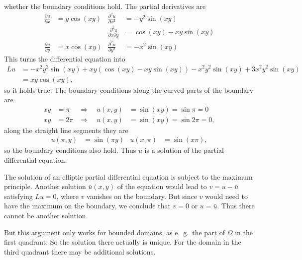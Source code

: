 \begin{loesung}
\begin{teilaufgaben}
whether the boundary conditions hold.
The partial derivatives are
\begin{align*}
\frac{\partial u}{\partial x}&=y\cos(xy)
&
\frac{\partial^2 u}{\partial x^2}&=-y^2\sin(xy)
\\
&&\frac{\partial^2 u}{\partial x\partial y}&=\cos(xy)-xy\sin(xy)
\\
\frac{\partial u}{\partial y}&=x\cos(xy)
&
\frac{\partial^2 u}{\partial y^2}&=-x^2\sin(xy)
\end{align*}
This turns the differential equation into
\begin{align*}
Lu&=-x^2y^2\sin(xy)+xy(\cos(xy)-xy\sin(xy))-x^2y^2\sin(xy)+3x^2y^2\sin(xy)\
\\
&=xy\cos(xy),
\end{align*}
so it holds true.
The boundary conditions along the curved parts of the boundary are
\begin{align*}
xy&=\pi&\Rightarrow\quad u(x,y)&=\sin(xy)=\sin\pi=0\\
xy&=2\pi&\Rightarrow\quad u(x,y)&=\sin(xy)=\sin2\pi=0,
\end{align*}
along the straight line segments they are
\begin{align*}
u(\pi,y)&=\sin(\pi y)
&u(x,\pi)&=\sin(x\pi),
\end{align*}
so the boundary conditions also hold.
Thus $u$ is a solution of the partial differential equation.
\item
The solution of an elliptic partial differential equation is subject to
the maximum principle.
Another solution $\bar u(x,y)$ of the equation would lead to
$v=u-\bar u$ satisfying $Lu=0$, where $v$ vanishes on the boundary.
But since $v$ would need to have the maximum on the boundary, we 
conclude that $v=0$ or $u=\bar{u}$.
Thus there cannot be another solution.

But this argument only works for bounded domains, as e.~g.~the part of
$\Omega$ in the first quadrant.
So the solution there actually is unique.
For the domain in the third quadrant there may be additional solutions.
\qedhere
\end{teilaufgaben}
\end{loesung}
